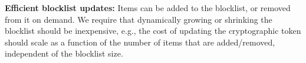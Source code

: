 		
	\item\textbf{Efficient blocklist updates:} Items can be added to the blocklist, or removed from 
	it on demand. We require that dynamically growing or shrinking the blocklist should be 
	inexpensive, e.g., the cost of updating the cryptographic token should scale as a function of 
	the 
	number of items that are added/removed, independent of the blocklist size. 
	
\itemListEnd
\fi
